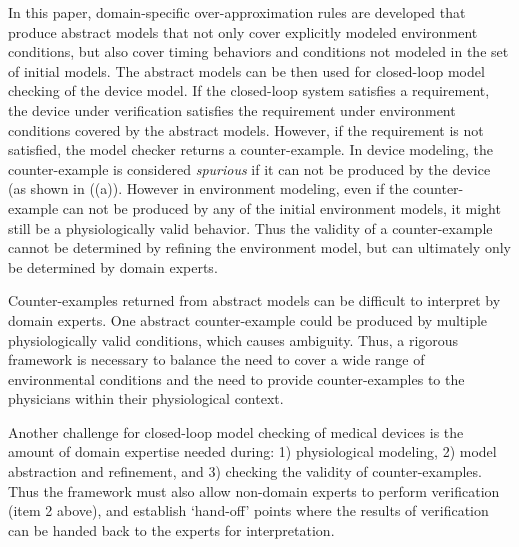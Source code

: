 In this paper, domain-specific over-approximation rules are developed that produce abstract models that not only cover explicitly modeled environment conditions, but also cover timing behaviors and conditions not modeled in the set of initial models. 
The abstract models can be then used for closed-loop model checking of the device model. 
If the closed-loop system satisfies a requirement, the device under verification satisfies the requirement under environment conditions covered by the abstract models. 
However, if the requirement is not satisfied, the model checker returns a counter-example. 
In device modeling, the counter-example is considered \emph{spurious} if it can not be produced by the device (as shown in ((a)).
However in environment modeling, even if the counter-example can not be produced by any of the initial environment models, it might still be a physiologically valid behavior.
Thus the validity of a counter-example cannot be determined by refining the environment model, but can ultimately only be determined by domain experts. 

Counter-examples returned from abstract models can be difficult to interpret by domain experts.
One abstract counter-example could be produced by multiple physiologically valid conditions, which causes ambiguity.
Thus, a rigorous framework is necessary to balance the need to cover a wide range of environmental conditions and the need to provide counter-examples to the physicians within their physiological context.

Another challenge for closed-loop model checking of medical devices is the amount of domain expertise needed during: 1) physiological modeling, 2) model abstraction and refinement, and 3) checking the validity of counter-examples.
Thus the framework must also allow non-domain experts to perform verification (item 2 above),
and establish `hand-off' points where the results of verification can be handed back 
to the experts for interpretation.

